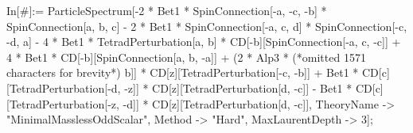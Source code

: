 In[\#]:= ParticleSpectrum[-2 * Bet1 * SpinConnection[-a, -c, -b] * SpinConnection[a, b, c] - 2 * Bet1 * SpinConnection[-a, c, d] * SpinConnection[-c, -d, a] - 4 * Bet1 * TetradPerturbation[a, b] * CD[-b][SpinConnection[-a, c, -c]] + 4 * Bet1 * CD[-b][SpinConnection[a, b, -a]] + (2 * Alp3 * (*omitted 1571 characters for brevity*) b]] * CD[z][TetradPerturbation[-c, -b]] + Bet1 * CD[c][TetradPerturbation[-d, -z]] * CD[z][TetradPerturbation[d, -c]] - Bet1 * CD[c][TetradPerturbation[-z, -d]] * CD[z][TetradPerturbation[d, -c]], TheoryName -> "MinimalMasslessOddScalar", Method -> "Hard", MaxLaurentDepth -> 3];
